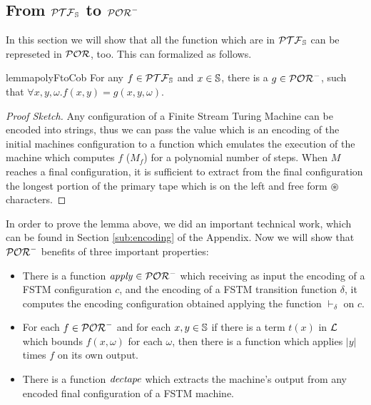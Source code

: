 \subsection{From $\mathcal{PTF}_{\mathbb{S}}$ to $\mathcal{POR}^-$}\label{sec:G}

In this section we will show that all the function which are in $\mathcal{PTF}_{\mathbb{S}}$
can be represeted in $\mathcal{POR}$, too. This can formalized as follows.

\begin{restatable}{lemma}{polyFtoCob}
\label{lemma:polyFtoCob}
  For any $f\in \mathcal{PTF}_{\mathbb{S}}$ and $x\in \mathbb{S}$,
  there is a $g\in \mathcal{POR}^-$,
  such that
  $
  \forall x, y, \omega. f(x, y)=g(x, y,\omega).
  $
\end{restatable}

\begin{proof}[Proof Sketch]
  Any configuration of a Finite Stream Turing Machine
  can be encoded into strings, thus we
  can pass the value which is an encoding of the initial machines configuration
  to a function which emulates the execution of the machine which computes $f$ ($M_f$) for
  a  polynomial number of steps.
  When $M$ reaches a final configuration, it is sufficient to extract
  from the final configuration the longest portion of the primary tape
  which is on the left and free form $\circledast$ characters.
\end{proof}

In order to prove the lemma above, we did an important technical work, which can
be found in Section \ref{sub:encoding} of the Appendix. Now we will show that
$\mathcal{POR}^-$ benefits of three important properties:

\begin{itemize}
  \item There is a function $\mathit{apply} \in \mathcal{POR}^-$ which receiving as input
  the encoding of a FSTM configuration $c$, and the encoding of a
  FSTM transition function $\delta$,
  it computes the encoding configuration obtained
  applying the function $\vdash_\delta$ on $c$.
  \item For each $f \in \mathcal{POR}^-$ and for each $x, y \in \mathbb{S}$ if there is a
  term $t(x)$ in $\mathcal L$
  which bounds $f(x, \omega)$ for each $\omega$, then there is a function which
  applies $|y|$ times $f$ on its own output.
  \item There is a function $\mathit{dectape}$ which extracts
  the machine's output from any encoded final configuration of a FSTM machine.
\end{itemize}

